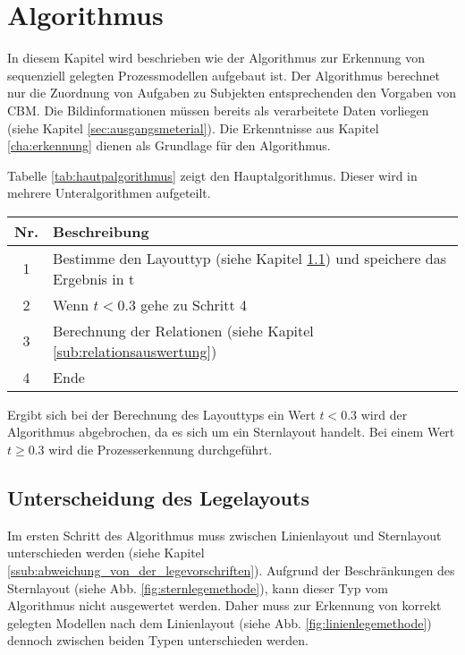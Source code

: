 %
%
% 
% 
% 

\chapter{Algorithmus} 
\label{cap:algorithmus}
In diesem Kapitel wird beschrieben wie der Algorithmus zur Erkennung von sequenziell gelegten Prozessmodellen aufgebaut ist. Der Algorithmus berechnet nur die Zuordnung von Aufgaben zu Subjekten entsprechenden den Vorgaben von CBM. Die Bildinformationen müssen bereits als verarbeitete Daten vorliegen (siehe Kapitel \ref{sec:ausgangsmeterial}). Die Erkenntnisse aus Kapitel \ref{cha:erkennung} dienen als Grundlage für den Algorithmus.

Tabelle \ref{tab:hautpalgorithmus} zeigt den Hauptalgorithmus. Dieser wird in mehrere Unteralgorithmen aufgeteilt. 

\begin{center}
	\label{tab:hautpalgorithmus}
	\begin{tabularx}
		{1.0\linewidth}{ c X } \textbf{Nr.} & \textbf{Beschreibung} \\
		\hline 1 & Bestimme den Layouttyp (siehe Kapitel  \ref{sub:unterscheidung_der_legemethoden}) und speichere das Ergebnis in t\\
		\hline 2 & Wenn $t < 0.3$ gehe zu Schritt 4 \\
		\hline 3 & Berechnung der Relationen (siehe Kapitel \ref{sub:relationsauswertung})\\
		\hline 4 & Ende
	\end{tabularx}
\end{center}

Ergibt sich bei der Berechnung des Layouttyps ein Wert $t<0.3$ wird der Algorithmus abgebrochen, da es sich um ein Sternlayout handelt. Bei einem Wert $t \geq 0.3$ wird die Prozesserkennung durchgeführt. 

\section{Unterscheidung des Legelayouts} %
\label{sub:unterscheidung_der_legemethoden}
Im ersten Schritt des Algorithmus muss zwischen Linienlayout und Sternlayout unterschieden werden (siehe Kapitel \ref{ssub:abweichung_von_der_legevorschriften}). Aufgrund der Beschränkungen des Sternlayout (siehe Abb. \ref{fig:sternlegemethode}), kann dieser Typ vom Algorithmus nicht ausgewertet werden. Daher muss zur Erkennung von korrekt gelegten Modellen nach dem Linienlayout (siehe Abb. \ref{fig:linienlegemethode}) dennoch zwischen beiden Typen unterschieden werden.


